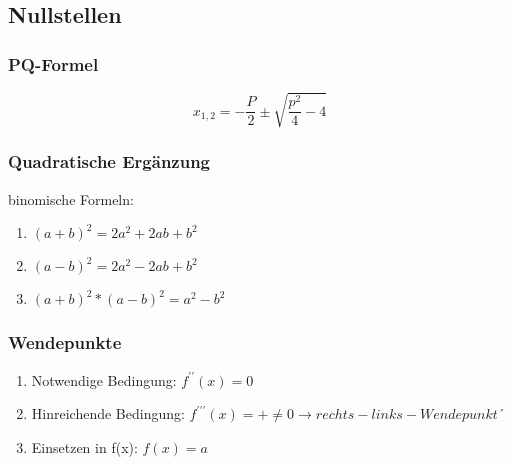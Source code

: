 	\subsection{Nullstellen}
		\subsubsection{PQ-Formel}
			$$
x_{1, 2} = - \frac{P}{2} \pm \sqrt{\frac{p^{2}}{4}-4}
			$$
		\subsubsection{Quadratische Ergänzung}
			binomische Formeln:
				\begin{enumerate}
					\item $(a+b)^{2} = 2a^{2}+2ab+b^{2}$
					\item $(a-b)^{2} = 2a^{2}-2ab+b^{2}$
					\item $(a+b)^{2}*(a-b)^{2}  = a^{2}-b^{2}$
				\end{enumerate}
		\subsubsection{Wendepunkte}
			\begin{enumerate}
				\item Notwendige Bedingung: $f^{\prime\prime}(x)=0$
				\item Hinreichende Bedingung: $f^{\prime\prime\prime}(x)=+\neq0 \rightarrow rechts-links-Wendepunkt´$
				\item Einsetzen in f(x): $f(x)=a$
			\end{enumerate}